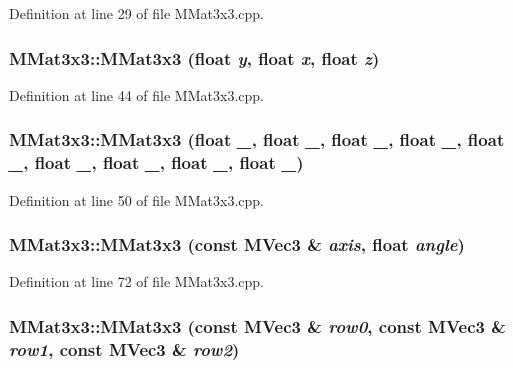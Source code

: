 Definition at line 29 of file MMat3x3.cpp.\hypertarget{class_m_mat3x3_f751a2f8378abde20ffe3fcfc39a726b}{
\subsubsection[{MMat3x3}]{\setlength{\rightskip}{0pt plus 5cm}MMat3x3::MMat3x3 (float {\em y}, \/  float {\em x}, \/  float {\em z})}}
\label{class_m_mat3x3_f751a2f8378abde20ffe3fcfc39a726b}




Definition at line 44 of file MMat3x3.cpp.\hypertarget{class_m_mat3x3_f53f2aa6c4d47b4f44580574299800ef}{
\subsubsection[{MMat3x3}]{\setlength{\rightskip}{0pt plus 5cm}MMat3x3::MMat3x3 (float {\em \_}, \/  float {\em \_}, \/  float {\em \_}, \/  float {\em \_}, \/  float {\em \_}, \/  float {\em \_}, \/  float {\em \_}, \/  float {\em \_}, \/  float {\em \_})}}
\label{class_m_mat3x3_f53f2aa6c4d47b4f44580574299800ef}




Definition at line 50 of file MMat3x3.cpp.\hypertarget{class_m_mat3x3_f3b19cba8bce9dd0916fdc214faee6cb}{
\subsubsection[{MMat3x3}]{\setlength{\rightskip}{0pt plus 5cm}MMat3x3::MMat3x3 (const {\bf MVec3} \& {\em axis}, \/  float {\em angle})}}
\label{class_m_mat3x3_f3b19cba8bce9dd0916fdc214faee6cb}




Definition at line 72 of file MMat3x3.cpp.\hypertarget{class_m_mat3x3_5940f6a8f9f4a0d11fd737a9b8f78c85}{
\subsubsection[{MMat3x3}]{\setlength{\rightskip}{0pt plus 5cm}MMat3x3::MMat3x3 (const {\bf MVec3} \& {\em row0}, \/  const {\bf MVec3} \& {\em row1}, \/  const {\bf MVec3} \& {\em row2})}}
\label{class_m_mat3x3_5940f6a8f9f4a0d11fd737a9b8f78c85}




